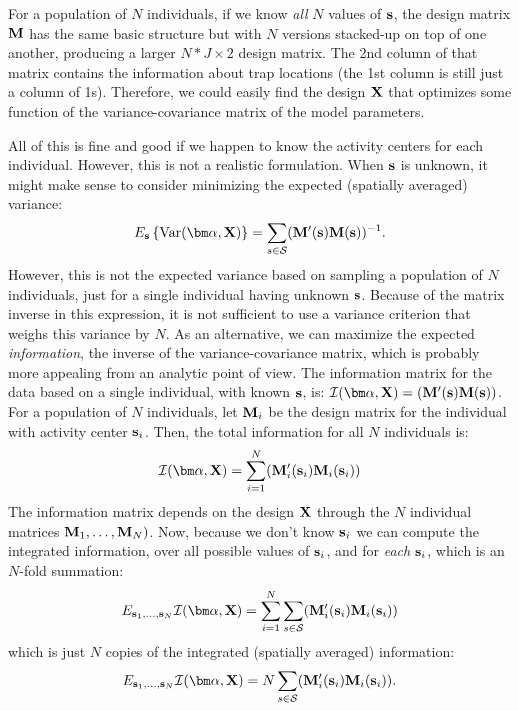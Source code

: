 For a population of $N$ individuals, if we know {\it all} $N$ values
of ${\bf s}$, the design matrix ${\bf M}$ has the same basic structure
but with $N$ versions 
stacked-up on top of one another, producing a larger $N*J \times 2$
design matrix.  The 2nd column of that matrix contains the information
about trap locations (the 1st column is still just a column of 1s). 
Therefore, 
 we could easily find the design ${\bf X}$ that
optimizes some function of the variance-covariance matrix of the model
parameters.

All of this is fine and good if we happen to know the activity
centers for each individual. However, this is not a realistic
formulation. When ${\bf s}$ is unknown, it might make sense to consider
minimizing the expected (spatially averaged) variance:
\[
  E_{{\bf s}}\left\{ \mbox{Var}({\bm \alpha},{\bf X}) \right\} = \sum_{s \in
    {\cal S}}  ({\bf M}'({\bf s}){\bf M}({\bf s}))^{-1}.
\]
However, this is not the expected variance based on sampling a population
of $N$ individuals, just for a single individual having unknown ${\bf
  s}$. Because of the matrix inverse in this expression, it is not
sufficient to use a variance criterion that weighs this variance by
$N$.  As an alternative, we can
maximize the expected {\it information}, the inverse of the
variance-covariance matrix, which is probably more
appealing from an analytic point of view.  The information matrix for
the data based on a single individual, with known ${\bf s}$, is:
${\cal I}({\bm \alpha},{\bf X}) =
 ({\bf M}'({\bf s}){\bf M}({\bf s}))$.
For a population of $N$ individuals, let ${\bf M}_{i}$ be the design
matrix for the individual with
activity center ${\bf s}_{i}$. Then, the total information for all $N$
individuals is:
\[
 {\cal I}({\bm \alpha},{\bf X}) = 
 \sum_{i=1}^{N}  ({\bf M}_{i}'({\bf s}_{i}){\bf M}_{i}({\bf s}_{i}))
\]
The information matrix depends on the design ${\bf X}$ through the $N$
individual matrices ${\bf M}_{1},\ldots,{\bf M}_{N})$.
Now, because we don't know ${\bf s}_{i}$ we can compute the integrated
information, over all possible values of ${\bf s}_{i}$, and for {\it
  each} ${\bf s}_{i}$, which is an $N$-fold summation:
\[
E_{ {\bf s}_{1}, \ldots, {\bf s}_{N}}
 {\cal I}({\bm \alpha},{\bf X}) = 
 \sum_{i=1}^{N}  \sum_{s \in {\cal S}} ({\bf M}_{i}'({\bf s}_{i}){\bf M}_{i}({\bf s}_{i}))
\]
which is just $N$ copies of
the integrated (spatially averaged) information:
\[
E_{ {\bf s}_{1}, \ldots, {\bf s}_{N}}
 {\cal I}({\bm \alpha},{\bf X})
=  N \sum_{s \in {\cal S}} ({\bf M}_{i}'({\bf s}_{i}){\bf M}_{i}({\bf s}_{i})).
\]


